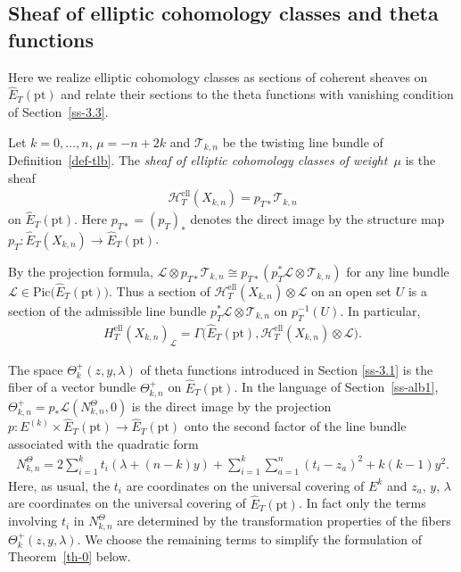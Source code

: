 \documentclass[10pt,a4paper]{amsart}
\numberwithin{equation}{section}
\begin{document}
\subsection{Sheaf of elliptic cohomology classes and theta functions}
Here we realize elliptic cohomology classes as sections of coherent sheaves on $\hat E_T(\mathrm{pt})$ and relate their sections to the theta functions with vanishing condition of Section~\ref{ss-3.3}.
\begin{Definition} Let $k=0,\dots,n$, $\mu=-n+2k$ and $\mathcal T_{k,n}$ be the twisting line bundle of Definition~\ref{def-tlb}. The {\em sheaf of elliptic cohomology classes of weight~$\mu$} is the sheaf
 \begin{gather*}
 \mathcal H_T^{\mathrm{ell}}(X_{k,n})=p_{T*}\mathcal T_{k,n}
 \end{gather*}
 on $\hat E_T(\mathrm{pt})$. Here $p_{T*}=(p_T)_*$ denotes the direct image by the structure map $p_T\colon \hat E_T(X_{k,n})\to \hat E_T(\mathrm{pt})$.
\end{Definition}
By the projection formula, $\mathcal L\otimes p_{T*}\mathcal T_{k,n}\cong p_{T*}(p_T^*\mathcal L\otimes \mathcal T_{k,n})$ for any line bundle $\mathcal L\in \mathrm{Pic}\big(\hat E_T(\mathrm{pt})\big)$. Thus a section of $\mathcal H_T^{\mathrm{ell}}(X_{k,n})\otimes \mathcal L$ on an open set $U$ is a section of the admissible line bundle $p_T^*\mathcal L\otimes \mathcal T_{k,n}$ on $p_T^{-1}(U)$. In particular,
\begin{gather*}
 H^{\mathrm{ell}}_T(X_{k,n})_{\mathcal L}=\Gamma\big(\hat E_T(\mathrm{pt}),\mathcal H^{\mathrm{ell}}_T(X_{k,n})\otimes\mathcal L\big).
\end{gather*}

The space $\Theta^+_k(z,y,\lambda)$ of theta functions introduced in Section \ref{ss-3.1} is the fiber of a vector bundle $\Theta^+_{k,n}$ on $\hat E_T(\mathrm{pt})$. In the language of Section~\ref{ss-alb1}, $\Theta^+_{k,n}=p_*\mathcal L(N^\Theta_{k,n},0)$ is the direct image by the projection $p\colon E^{(k)}\times\hat E_T(\mathrm{pt})\to \hat E_T(\mathrm{pt})$ onto the second factor of the line bundle associated with the quadratic form
\begin{gather}\label{e-NTheta}
 N^\Theta_{k,n} =2\sum_{i=1}^kt_i(\lambda+(n-k)y)+\sum_{i=1}^k\sum_{a=1}^n(t_i-z_a)^2+k(k-1)y^2.
\end{gather}
Here, as usual, the $t_i$ are coordinates on the universal covering of $E^k$ and $z_a$, $y$, $\lambda$ are coordinates on the universal covering of $\hat E_T(\mathrm{pt})$. In fact only the terms involving $t_i$ in $N^\Theta_{k,n}$ are determined by the transformation properties of the fibers $\Theta^+_k(z,y,\lambda)$. We choose the remaining terms to simplify the formulation of Theorem~\ref{th-0} below.
\end{document}
